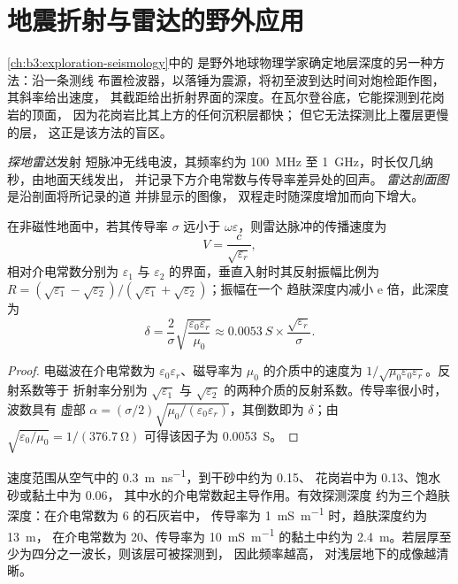 \section{地震折射与雷达的野外应用}\label{sec:b3:field-lab-methods-3:radar}

\cref{ch:b3:exploration-seismology}中的
是野外地球物理学家确定地层深度的另一种方法：沿一条测线
布置检波器，以落锤为震源，将初至波到达时间对炮检距作图，
其斜率给出速度，
其截距给出折射界面的深度。在瓦尔登谷底，它能探测到花岗岩的顶面，
因为花岗岩比其上方的任何沉积层都快；
但它无法探测比上覆层更慢的层，
这正是该方法的盲区。

\begin{definition}\label{def:b3:field-lab-methods-3:gpr}
\emph{探地雷达}发射
短脉冲无线电波，其频率约为 \qty{100}{MHz} 至
\qty{1}{GHz}，时长仅几纳秒，由地面天线发出，
并记录下方介电常数与传导率差异处的回声。
\emph{雷达剖面图}是沿剖面将所记录的道
并排显示的图像，
双程走时随深度增加而向下增大。
\end{definition}

\begin{proposition}\label{prop:b3:field-lab-methods-3:radar}
在非磁性地面中，若其传导率 $\sigma$ 远小于
$\omega\varepsilon$，则雷达脉冲的传播速度为
\[
V = \frac{c}{\sqrt{\varepsilon_r}} ,
\]
相对介电常数分别为 $\varepsilon_1$ 与
$\varepsilon_2$ 的界面，垂直入射时其反射振幅比例为 $R =
(\sqrt{\varepsilon_1} - \sqrt{\varepsilon_2})/(\sqrt{\varepsilon_1} +
\sqrt{\varepsilon_2})$；振幅在一个
趋肤深度内减小 $\mathrm{e}$ 倍，此深度为
\[
\delta = \frac{2}{\sigma}\sqrt{\frac{\varepsilon_0\varepsilon_r}{\mu_0}}
       \approx \qty{0.0053}{S}\times\frac{\sqrt{\varepsilon_r}}{\sigma} .
\]
\end{proposition}

\begin{proof}
电磁波在介电常数为
$\varepsilon_0\varepsilon_r$、磁导率为 $\mu_0$ 的介质中的速度为
$1/\sqrt{\mu_0\varepsilon_0\varepsilon_r}$。反射系数等于
折射率分别为 $\sqrt{\varepsilon_1}$ 与
$\sqrt{\varepsilon_2}$ 的两种介质的反射系数。传导率很小时，波数具有
虚部 $\alpha = (\sigma/2)\sqrt{\mu_0/(\varepsilon_0
\varepsilon_r)}$，其倒数即为 $\delta$；由 $\sqrt{\varepsilon_0/
\mu_0} = 1/(\qty{376.7}{\ohm})$ 可得该因子为 \qty{0.0053}{S}。
\end{proof}

速度范围从空气中的 \qty{0.3}{m.ns^{-1}}，到干砂中约为 \num{0.15}、
花岗岩中为 \num{0.13}、饱水砂或黏土中为 \num{0.06}，
其中水的介电常数起主导作用。有效探测深度
约为三个趋肤深度：在介电常数为 6 的石灰岩中，
传导率为 \qty{1}{mS.m^{-1}} 时，趋肤深度约为 \qty{13}{m}，
在介电常数为 20、传导率为 \qty{10}{mS.m^{-1}} 的黏土中约为
\qty{2.4}{m}。若层厚至少为四分之一波长，则该层可被探测到，
因此频率越高，
对浅层地下的成像越清晰。

